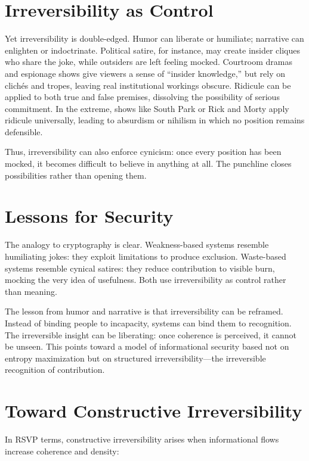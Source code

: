 \documentclass{book}
\begin{document}
\section{Irreversibility as Control}

Yet irreversibility is double-edged. Humor can liberate or humiliate; narrative can enlighten or indoctrinate. Political satire, for instance, may create insider cliques who share the joke, while outsiders are left feeling mocked. Courtroom dramas and espionage shows give viewers a sense of “insider knowledge,” but rely on clichés and tropes, leaving real institutional workings obscure. Ridicule can be applied to both true and false premises, dissolving the possibility of serious commitment. In the extreme, shows like South Park or Rick and Morty apply ridicule universally, leading to absurdism or nihilism in which no position remains defensible.

Thus, irreversibility can also enforce cynicism: once every position has been mocked, it becomes difficult to believe in anything at all. The punchline closes possibilities rather than opening them.

\section{Lessons for Security}

The analogy to cryptography is clear. Weakness-based systems resemble humiliating jokes: they exploit limitations to produce exclusion. Waste-based systems resemble cynical satires: they reduce contribution to visible burn, mocking the very idea of usefulness. Both use irreversibility as control rather than meaning.

The lesson from humor and narrative is that irreversibility can be reframed. Instead of binding people to incapacity, systems can bind them to recognition. The irreversible insight can be liberating: once coherence is perceived, it cannot be unseen. This points toward a model of informational security based not on entropy maximization but on structured irreversibility—the irreversible recognition of contribution.

\section{Toward Constructive Irreversibility}

In RSVP terms, constructive irreversibility arises when informational flows increase coherence and density:
\end{document}
